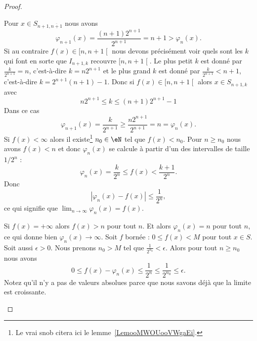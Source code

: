 \begin{proof}
\begin{subproof}
		Pour \( x\in S_{n+1,\overline{ n+1 }}\) nous avons
		\begin{equation}
			\varphi_{n+1}(x)=\frac{ (n+1)2^{n+1} }{ 2^{n+1} }=n+1>\varphi_n(x).
		\end{equation}
		Si au contraire \( f(x)\in\mathopen[ n , n+1 \mathclose[ \) nous devons précisément voir quels sont les \( k\) qui font en sorte que \( I_{n+1,k}\) recouvre \( \mathopen[ n , n+1 \mathclose[\). Le plus petit \( k\) est donné par \( \frac{ k }{ 2^{n+1} }=n\), c'est-à-dire \( k=n2^{n+1}\) et le plus grand \( k\) est donné par \( \frac{ k }{ 2^{n+1} }<n+1\), c'est-à-dire \( k=2^{n+1}(n+1)-1\). Donc si \( f(x)\in\mathopen[ n , n+1 \mathclose[\) alors \( x\in S_{n+1,k}\) avec
		\begin{equation}
			n2^{n+1}\leq k\leq (n+1)2^{n+1}-1
		\end{equation}
		Dans ce cas
		\begin{equation}
			\varphi_{n+1}(x)=\frac{ k }{ 2^{n+1} }\geq \frac{ n2^{n+1} }{ 2^{n+1} }=n=\varphi_n(x).
		\end{equation}
		Si \( f(x)<\infty\) alors il existe\footnote{Le vrai snob citera ici le lemme~\ref{LemooMWOUooVWgaEi}.} \( n_0\in\eN\) tel que \( f(x)<n_0\). Pour \( n\geq n_0\) nous avons \( f(x)<n\) et donc \( \varphi_n(x)\) se calcule à partir d'un des intervalles de taille \( 1/2^n\) :
		\begin{equation}
			\varphi_n(x)=\frac{ k }{ 2^n }\leq f(x)<\frac{ k+1 }{ 2^n }.
		\end{equation}
		Donc
		\begin{equation}
			| \varphi_n(x)-f(x) |\leq \frac{1}{ 2^n },
		\end{equation}
		ce qui signifie que \( \lim_{n\to \infty} \varphi_n(x)=f(x)\).

		Si \( f(x)=+\infty\) alors \( f(x)>n\) pour tout \( n\). Et alors \( \varphi_n(x)=n\) pour tout \( n\), ce qui donne bien \( \varphi_n(x)\to \infty\).
		Soit \( f\) bornée : \( 0\leq f(x)<M\) pour tout \( x\in S\). Soit aussi \( \epsilon>0\). Nous prenons \( n_0>M\) tel que \( \frac{1}{ 2^{n_0} }<\epsilon\). Alors pour tout \( n\geq n_0\) nous avons
		\begin{equation}
			0\leq f(x)-\varphi_n(x)\leq \frac{1}{ 2^n }\leq \frac{1}{ 2^{n_0} }\leq \epsilon.
		\end{equation}
		Notez qu'il n'y a pas de valeurs absolues parce que nous savons déjà que la limite est croissante.
	\end{subproof}
\end{proof}


